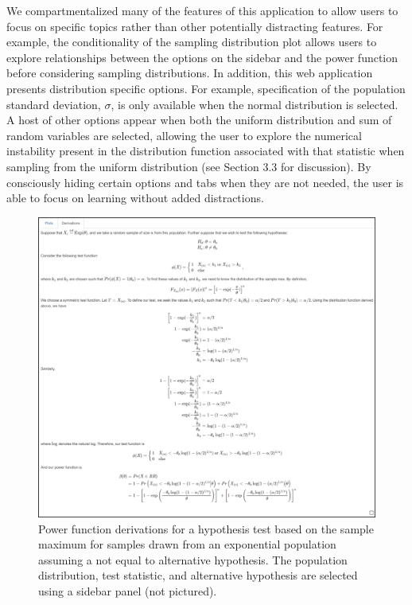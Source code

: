 \documentclass{TISE}
\begin{document}
We compartmentalized many of the features of this application to allow users to focus on specific topics rather than other potentially distracting features. For example, the conditionality of the sampling distribution plot allows users to explore relationships between the options on the sidebar and the power function before considering sampling distributions. In addition, this web application presents distribution specific options. For example, specification of the population standard deviation, $\sigma$, is only available when the normal distribution is selected. A host of other options appear when both the uniform distribution and sum of random variables are selected, allowing the user to explore the numerical instability present in the distribution function associated with that statistic when sampling from the uniform distribution (see Section 3.3 for discussion). By consciously hiding certain options and tabs when they are not needed, the user is able to focus on learning without added distractions. 

\begin{figure}[H]
	\centering
	\includegraphics[width=\linewidth]{derivs.png}
	\caption{Power function derivations for a hypothesis test based on the sample maximum for samples drawn from an exponential population assuming a not equal to alternative hypothesis. The population distribution, test statistic, and alternative hypothesis are selected using a sidebar panel (not pictured).}
\end{figure}
\end{document}
